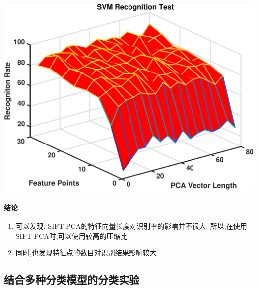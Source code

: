 		\begin{center}
		\begin{minipage}[t]{\linewidth}
		\center
		{
		\includegraphics[width=\textwidth]{Img/c3/sift_pca_iter} 
		}
		\end{minipage}
		\medskip
		\end{center}

\paragraph{结论}

\begin{enumerate}
	\item 可以发现, SIFT-PCA的特征向量长度对识别率的影响并不很大, 所以,在使用SIFT-PCA时,可以使用较高的压缩比
	\item 同时,也发现特征点的数目对识别结果影响较大
\end{enumerate}

\subsection{结合多种分类模型的分类实验}



